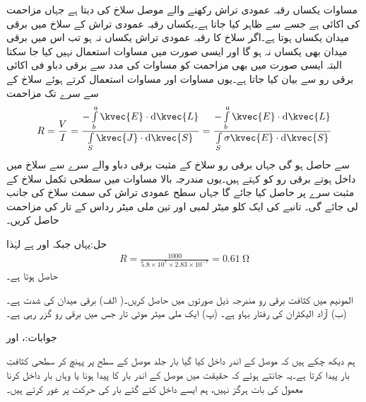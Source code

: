 مساوات  یکساں رقبہ عمودی تراش رکھنے والے موصل سلاخ کی  دیتا ہے جہاں مزاحمت کی اکائی  ہے جسے  سے ظاہر کیا جاتا ہے۔یکساں رقبہ عمودی تراش کے سلاخ میں برقی میدان یکساں ہوتا ہے۔اگر سلاخ کا رقبہ عمودی تراش یکساں نہ ہو تب اس میں برقی میدان بھی یکساں نہ ہو گا اور ایسی صورت میں مساوات  استعمال نہیں کیا جا سکتا البتہ ایسی صورت میں بھی مزاحمت کو مساوات  کی مدد سے برقی دباو فی اکائی برقی رو سے بیان کیا جاتا ہے۔یوں مساوات  اور مساوات  استعمال کرتے ہوئے سلاخ کے   سے  سرے تک مزاحمت
\begin{align}\label{مساوات_کپیسٹر_مزاحمت_کی_عمومی_مساوات}
R=\frac{V}{I}=\frac{-\int \limits_b^a \kvec{E} \cdot \dif \kvec{L}}{\int \limits_S \kvec{J} \cdot \dif \kvec{S}}=\frac{-\int \limits_b^a \kvec{E} \cdot \dif \kvec{L}}{\int \limits_S \sigma \kvec{E} \cdot \dif \kvec{S}}
\end{align} 
سے حاصل ہو گی جہاں برقی رو سلاخ کے مثبت برقی دباو والے سرے سے سلاخ میں داخل ہوتے برقی رو کو کہتے ہیں۔یوں مندرجہ بالا مساوات میں سطحی تکمل سلاخ کے مثبت سرے پر حاصل کیا جائے گا جہاں سطح عمودی تراش کی سمت سلاخ کی جانب لی جائے گی۔
تانبے کی ایک کلو میٹر لمبی اور تین ملی میٹر رداس کے تار کی مزاحمت حاصل کریں۔

حل:یہاں  جبکہ  اور  ہے لہٰذا
\begin{align*}
R=\frac{1000}{5.8\times 10^7 \times 2.83 \times 10^{-7}}=\SI{0.61}{\ohm}
\end{align*}
حاصل ہوتا ہے۔

المونیم میں کثافت برقی رو مندرجہ ذیل صورتوں میں حاصل کریں۔( الف) برقی میدان کی شدت  ہے۔ (ب) آزاد الیکٹران کی رفتار بہاو  ہے۔ (پ) ایک ملی میٹر موٹی تار جس میں  برقی رو گزر رہی ہے۔

جوابات:،   اور 

ہم دیکھ چکے ہیں کہ موصل کے اندر داخل کیا گیا بار  جلد موصل کے سطح پر پہنچ کر سطحی کثافتِ بار پیدا کرتا ہے۔یہ جانتے ہوئے کہ حقیقت میں موصل کے اندر بار کا پیدا ہونا یا وہاں بار داخل کرنا معمول کی بات ہرگز نہیں، ہم ایسے داخل کئے گئے بار کی حرکت پر غور کرتے ہیں۔

